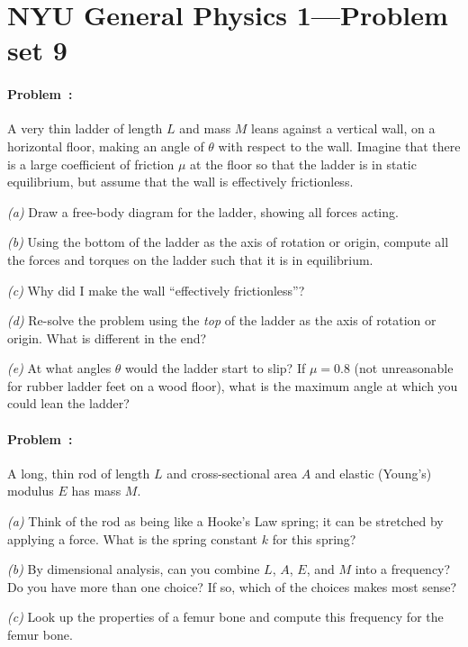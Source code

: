 \documentclass[12pt]{article}
\newcounter{problem}
\begin{document}
\thispagestyle{empty}

\section*{NYU General Physics 1---Problem set 9}

\paragraph{Problem~\theproblem:}%
A very thin ladder of length $L$ and mass $M$ leans against a vertical
wall, on a horizontal floor, making an angle of $\theta$ with respect
to the wall.  Imagine that there is a large coefficient of friction
$\mu$ at the floor so that the ladder is in static
equilibrium, but assume that the wall is effectively frictionless.

\textsl{(a)} Draw a free-body diagram for the ladder, showing all
forces acting.

\textsl{(b)} Using the bottom of the ladder as the axis of rotation or
origin, compute all the forces and torques on the ladder such that it
is in equilibrium.

\textsl{(c)} Why did I make the wall ``effectively frictionless''?

\textsl{(d)} Re-solve the problem using the \emph{top} of the ladder
as the axis of rotation or origin.  What is different in the end?

\textsl{(e)} At what angles $\theta$ would the ladder start to slip?
If $\mu=0.8$ (not unreasonable for rubber ladder feet on a wood
floor), what is the maximum angle at which you could lean the ladder?

\paragraph{Problem~\theproblem:}%
A long, thin rod of length $L$ and cross-sectional area $A$ and
elastic (Young's) modulus $E$ has mass $M$.

\textsl{(a)} Think of the rod as being like a Hooke's Law spring; it
can be stretched by applying a force.  What is the spring constant $k$
for this spring?

\textsl{(b)} By dimensional analysis, can you combine $L$, $A$, $E$,
and $M$ into a frequency?  Do you have more than one choice?  If so,
which of the choices makes most sense?

\textsl{(c)} Look up the properties of a femur bone and compute this
frequency for the femur bone.
\end{document}
